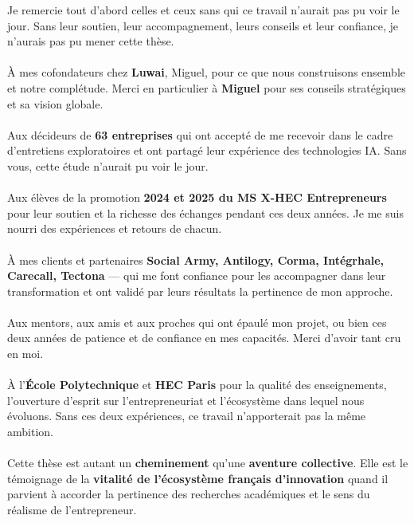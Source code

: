 Je remercie tout d’abord celles et ceux sans qui ce travail n’aurait pas pu voir le jour. Sans leur soutien, leur accompagnement, leurs conseils et leur confiance, je n’aurais pas pu mener cette thèse.
\\\\
À mes cofondateurs chez \textbf{Luwai}, Miguel, pour ce que nous construisons ensemble et notre complétude. Merci en particulier à \textbf{Miguel} pour ses conseils stratégiques et sa vision globale.
\\\\
Aux décideurs de \textbf{63 entreprises} qui ont accepté de me recevoir dans le cadre d’entretiens exploratoires et ont partagé leur expérience des technologies IA. Sans vous, cette étude n’aurait pu voir le jour.
\\\\
Aux élèves de la promotion \textbf{2024 et 2025 du MS X-HEC Entrepreneurs} pour leur soutien et la richesse des échanges pendant ces deux années. Je me suis nourri des expériences et retours de chacun.
\\\\
À mes clients et partenaires  \textbf{Social Army, Antilogy, Corma, Intégrhale, Carecall, Tectona} — qui me font confiance pour les accompagner dans leur transformation et ont validé par leurs résultats la pertinence de mon approche.
\\\\
Aux mentors, aux amis et aux proches qui ont épaulé mon projet, ou bien ces deux années de patience et de confiance en mes capacités. Merci d’avoir tant cru en moi.
\\\\
À l’\textbf{École Polytechnique} et \textbf{HEC Paris} pour la qualité des enseignements, l’ouverture d’esprit sur l’entrepreneuriat et l’écosystème dans lequel nous évoluons. Sans ces deux expériences, ce travail n’apporterait pas la même ambition.
\\\\
Cette thèse est autant un \textbf{cheminement} qu’une \textbf{aventure collective}. Elle est le témoignage de la \textbf{vitalité de l’écosystème français d’innovation} quand il parvient à accorder la pertinence des recherches académiques et le sens du réalisme de l’entrepreneur.